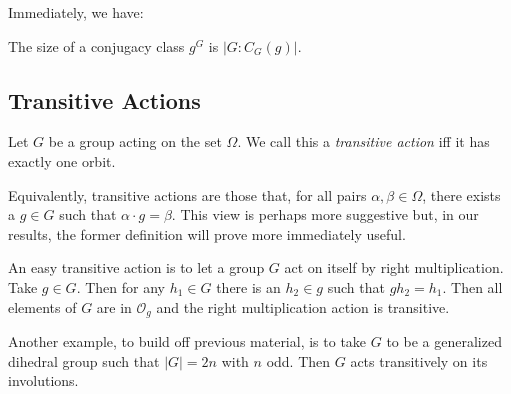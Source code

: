 \documentclass[main.tex]{subfiles}
\begin{document}
Immediately, we have:

\begin{corollary}
The size of a conjugacy class $g^G$ is $|G : C_G(g)|$.
\end{corollary}

\hss

\subsection{Transitive Actions}

\hss

\begin{definition}
Let $G$ be a group acting on the set $\Omega$. We call this a \emph{transitive action} iff it has exactly one orbit.
\end{definition}

\hss

Equivalently, transitive actions are those that, for all pairs $\alpha, \beta \in \Omega$, there exists a $g \in G$ such that $ \alpha \cdot g = \beta$. This view is perhaps more suggestive but, in our results, the former definition will prove more immediately useful.

An easy transitive action is to let a group $G$ act on itself by right multiplication. Take $g \in G$. Then for any $h_1 \in G$ there is an $h_2 \in g$ such that $g h_2 = h_1$. Then all elements of $G$ are in $\mathcal{O}_g$ and the right multiplication action is transitive.

Another example, to build off previous material, is to take $G$ to be a generalized dihedral group such that $|G| = 2n$ with $n$ odd. Then $G$ acts transitively on its involutions.
\end{document}
